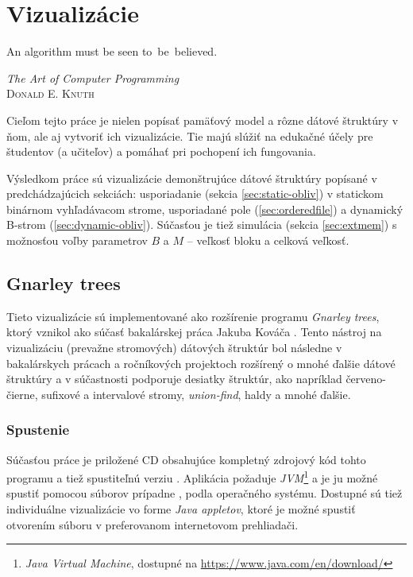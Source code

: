 \chapter{Vizualizácie}
\epigraph{An algorithm must be seen to~be~believed.}{\textit{The Art of Computer Programming}\\ \textsc{Donald E. Knuth}}

Cieľom tejto práce je nielen popísať \obliv pamäťový model a rôzne dátové štruktúry v ňom, ale aj vytvoriť ich vizualizácie. Tie majú slúžiť na edukačné účely pre študentov (a učiteľov) a pomáhať pri pochopení ich fungovania.

Výsledkom práce sú vizualizácie demonštrujúce dátové štruktúry popísané v predchádzajúcich sekciách:  usporiadanie (sekcia \ref{sec:static-obliv}) v statickom binárnom vyhľadávacom strome, usporiadané pole (\ref{sec:orderedfile}) a dynamický B-strom (\ref{sec:dynamic-obliv}). Súčasťou je tiež simulácia \cache (sekcia \ref{sec:extmem}) s možnosťou voľby parametrov $B$ a $M$ -- veľkosť bloku a celková veľkosť.

\section{Gnarley trees}
Tieto vizualizácie sú implementované ako rozšírenie programu \emph{Gnarley trees}, ktorý vznikol ako súčasť bakalárskej práca Jakuba Kováča \citep{algviskuko}. Tento nástroj na vizualizáciu (prevažne stromových) dátových štruktúr bol následne v bakalárskych prácach \citep{algviskotrlova, algvislukca, algvistomkovic} a ročníkových projektoch rozšírený o mnohé ďalšie dátové štruktúry a v súčastnosti podporuje desiatky štruktúr, ako napríklad červeno-čierne, sufixové a intervalové stromy, \emph{union-find}, haldy a mnohé ďalšie.

\subsection{Spustenie}
Súčasťou práce je priložené CD obsahujúce kompletný zdrojový kód \citep{attsource} tohto programu a tiež spustiteľnú verziu \citep{attbin}. Aplikácia požaduje \emph{JVM}\footnote{\emph{Java Virtual Machine}, dostupné na \url{https://www.java.com/en/download/}} a je ju možné spustiť pomocou súborov  prípadne , podla operačného systému. Dostupné sú tiež individuálne vizualizácie vo forme \emph{Java appletov}, ktoré je možné spustiť otvorením súboru  v preferovanom internetovom prehliadači.


